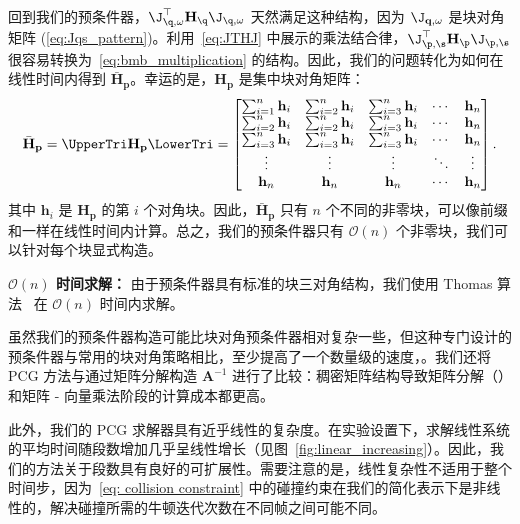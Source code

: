 回到我们的预条件器，$\J_{\q,\omega}^\top \mathbf{H}_\q \J_{\q, \omega}$ 天然满足这种结构，因为 $\J_{\mathbf{q, \omega}}$ 是块对角矩阵 (\cref{eq:Jqs_pattern})。利用~\cref{eq:JTHJ} 中展示的乘法结合律，$\J_{\p,\s}^\top \mathbf{H}_\p \J_{\p, \s}$ 很容易转换为~\cref{eq:bmb_multiplication} 的结构。因此，我们的问题转化为如何在线性时间内得到 $\bar{\mathbf{H}}_{\mathbf{p}}$。幸运的是，$\mathbf{H}_{\mathbf{p}}$ 是集中块对角矩阵：
\begin{equation}
  \bar{\mathbf{H}}_{\mathbf{p}} = \UpperTri \mathbf{H}_{\mathbf{p}} \LowerTri =
  \begin{bmatrix}
    \sum_{i=1}^{n} \mathbf{h}_{i} & \sum_{i=2}^{n} \mathbf{h}_{i} & \sum_{i=3}^{n} \mathbf{h}_{i} & \cdots & \mathbf{h}_{n} \\
    \sum_{i=2}^{n} \mathbf{h}_{i} & \sum_{i=2}^{n} \mathbf{h}_{i} & \sum_{i=3}^{n} \mathbf{h}_{i} & \cdots & \mathbf{h}_{n} \\
    \sum_{i=3}^{n} \mathbf{h}_{i} & \sum_{i=3}^{n} \mathbf{h}_{i} & \sum_{i=3}^{n} \mathbf{h}_{i} & \cdots & \mathbf{h}_{n} \\
    \vdots                        & \vdots                        & \vdots                        & \ddots & \vdots         \\
    \mathbf{h}_{n}                & \mathbf{h}_{n}                & \mathbf{h}_{n}                & \cdots & \mathbf{h}_{n} \\
  \end{bmatrix}.
\end{equation}
其中 $\mathbf{h}_{i}$ 是 $\mathbf{H}_{\mathbf{p}}$ 的第 $i$ 个对角块。因此，$\bar{\mathbf{H}}_{\mathbf{p}}$ 只有 $n$ 个不同的非零块，可以像前缀和一样在线性时间内计算。总之，我们的预条件器只有 $\mathcal{O}(n)$ 个非零块，我们可以针对每个块显式构造。

\textbf{$\mathcal{O}(n)$ 时间求解：} 由于预条件器具有标准的块三对角结构，我们使用 Thomas 算法~\cite{thomas1949elliptic} 在 $\mathcal{O}(n)$ 时间内求解。

虽然我们的预条件器构造可能比块对角预条件器相对复杂一些，但这种专门设计的预条件器与常用的块对角策略相比，至少提高了一个数量级的速度，。我们还将 PCG 方法与通过矩阵分解构造 $\mathbf A^{-1}$ 进行了比较：稠密矩阵结构导致矩阵分解（）和矩阵 - 向量乘法阶段的计算成本都更高。

{\color{black}
此外，我们的 PCG 求解器具有近乎线性的复杂度。在实验设置下，求解线性系统的平均时间随段数增加几乎呈线性增长（见图~\ref{fig:linear_increasing}）。因此，我们的方法关于段数具有良好的可扩展性。需要注意的是，线性复杂性不适用于整个时间步，因为~\cref{eq: collision constraint} 中的碰撞约束在我们的简化表示下是非线性的，解决碰撞所需的牛顿迭代次数在不同帧之间可能不同。
}

